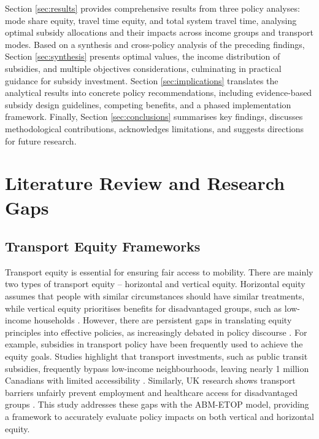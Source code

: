 \documentclass[a4paper,fleqn]{cas-sc}
\begin{document}
Section \ref{sec:results} provides comprehensive results from three policy analyses: mode share equity, travel time equity, and total system travel time, analysing optimal subsidy allocations and their impacts across income groups and transport modes. Based on a synthesis and cross-policy analysis of the preceding findings, Section \ref{sec:synthesis} presents optimal values, the income distribution of subsidies, and multiple objectives considerations, culminating in practical guidance for subsidy investment. Section \ref{sec:implications} translates the analytical results into concrete policy recommendations, including evidence-based subsidy design guidelines, competing benefits, and a phased implementation framework. Finally, Section \ref{sec:conclusions} summarises key findings, discusses methodological contributions, acknowledges limitations, and suggests directions for future research.

\section{Literature Review and Research Gaps}\label{sec:lit}

\subsection{Transport Equity Frameworks}
Transport equity is essential for ensuring fair access to mobility. There are mainly two types of transport equity – horizontal and vertical equity. Horizontal equity assumes that people with similar circumstances should have similar treatments, while vertical equity prioritises benefits for disadvantaged groups, such as low-income households \citep{Litman2025, vanWee2011}. However, there are persistent gaps in translating equity principles into effective policies, as increasingly debated in policy discourse \citep{Lucas2012, Martens2016, Litman2025, vanWee2011}. For example, subsidies in transport policy have been frequently used to achieve the equity goals. Studies highlight that transport investments, such as public transit subsidies, frequently bypass low-income neighbourhoods, leaving nearly 1 million Canadians with limited accessibility \citep{Allen2019}. Similarly, UK research shows transport barriers unfairly prevent employment and healthcare access for disadvantaged groups \citep{Titheridge2014}. This study addresses these gaps with the ABM-ETOP model, providing a framework to accurately evaluate policy impacts on both vertical and horizontal equity.
\end{document}
